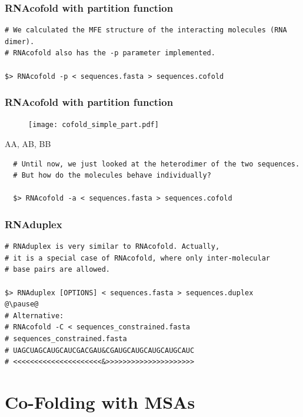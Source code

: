 \begin{frame}[c, fragile]\frametitle{RNAcofold with partition function}
  \begin{lstlisting}
# We calculated the MFE structure of the interacting molecules (RNA dimer).
# RNAcofold also has the -p parameter implemented. 

$> RNAcofold -p < sequences.fasta > sequences.cofold

  \end{lstlisting}
  \vspace{4em}
\end{frame}

\begin{frame}[c]\frametitle{RNAcofold with partition function}
  \begin{figure}
    \centering
    \texttt{[image: cofold\_simple\_part.pdf]}
  \end{figure}
\end{frame}


\begin{frame}[c,fragile]{AA, AB, BB}
    \begin{lstlisting}
  # Until now, we just looked at the heterodimer of the two sequences.
  # But how do the molecules behave individually?
  
  $> RNAcofold -a < sequences.fasta > sequences.cofold
    \end{lstlisting}
    \vspace{4em}
\end{frame}

\begin{frame}[c, fragile]\frametitle{RNAduplex}
  \begin{lstlisting}
# RNAduplex is very similar to RNAcofold. Actually,
# it is a special case of RNAcofold, where only inter-molecular
# base pairs are allowed.

$> RNAduplex [OPTIONS] < sequences.fasta > sequences.duplex
@\pause@
# Alternative:
# RNAcofold -C < sequences_constrained.fasta
# sequences_constrained.fasta
# UAGCUAGCAUGCAUCGACGAU&CGAUGCAUGCAUGCAUGCAUC
# <<<<<<<<<<<<<<<<<<<<<&>>>>>>>>>>>>>>>>>>>>>
  \end{lstlisting}
\end{frame}


\section[Alignments]{Co-Folding with MSAs}

